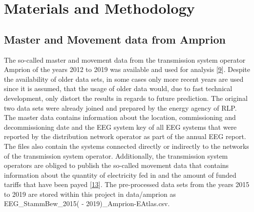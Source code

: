 \documentclass[a4paper,11pt]{article}
\begin{document}
\newpage

\hypertarget{materials-and-methodology}{%
\section{Materials and Methodology}\label{materials-and-methodology}}

\hypertarget{master-and-movement-data-from-amprion}{%
\subsection{Master and Movement data from Amprion}\label{master-and-movement-data-from-amprion}}

The so-called master and movement data from the transmission system operator Amprion of the years 2012 to 2019 was available and used for analysis {[}\protect\hyperlink{ref-EnergieagenturRheinlandPfalz.2021}{9}{]}. Despite the availability of older data sets, in some cases only more recent years are used since it is assumed, that the usage of older data would, due to fast technical development, only distort the results in regards to future prediction. The original two data sets were already joined and prepared by the energy agency of RLP. The master data contains information about the location, commissioning and decommissioning date and the EEG system key of all EEG systems that were reported by the distribution network operator as part of the annual EEG report. The files also contain the systems connected directly or indirectly to the networks of the transmission system operator. Additionally, the transmission system operators are obliged to publish the so-called movement data that contains information about the quantity of electricity fed in and the amount of funded tariffs that have been payed {[}\protect\hyperlink{ref-AmprionGmbH.2019}{13}{]}. The pre-processed data sets from the years 2015 to 2019 are stored within this project in data/amprion as EEG\_StammBew\_2015( - 2019)\_Amprion-EAtlas.csv.
\end{document}
